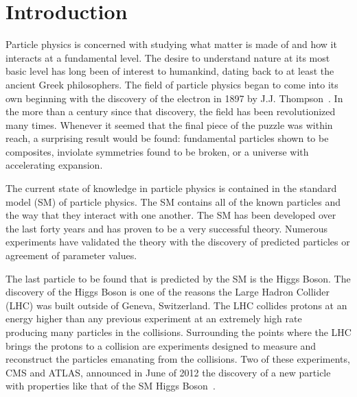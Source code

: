 \chapter{Introduction}

Particle physics is concerned with studying what matter is made of and how it interacts at a fundamental level.
The desire to understand nature at its most basic level has long been of interest to humankind, dating back to at least the ancient Greek philosophers.
The field of particle physics began to come into its own beginning with the discovery of the electron in 1897 by J.J. Thompson~\cite{griffiths2008introduction}.
In the more than a century since that discovery, the field has been revolutionized many times. Whenever it seemed that the final piece of the puzzle was within reach,
a surprising result would be found: fundamental particles shown to be composites, inviolate symmetries found to be broken,
or a universe with accelerating expansion.

The current state of knowledge in particle physics is contained in the standard model (SM) of particle physics. The SM contains all of the known
particles and the way that they interact with one another. The SM has been developed over the last forty years and has proven to be a very successful theory. 
Numerous experiments have validated the theory with the discovery of predicted particles or agreement of parameter values.

The last particle to be found that is predicted by the SM is the Higgs Boson.
The discovery of the Higgs Boson is one of the reasons the Large Hadron Collider (LHC) was built outside of Geneva, Switzerland. 
The LHC collides protons at an energy higher than any previous experiment at an extremely high rate~\cite{1748-0221-3-08-S08001}
producing many particles in the collisions.
Surrounding the points where the LHC brings the protons to a collision
are experiments designed to measure and reconstruct the particles emanating from the collisions. Two of these experiments, CMS and
ATLAS, announced in June of 2012 the discovery of a new particle with properties like that of the SM Higgs Boson~\cite{Chatrchyan:2013lba, Aad:2012tfa}.

